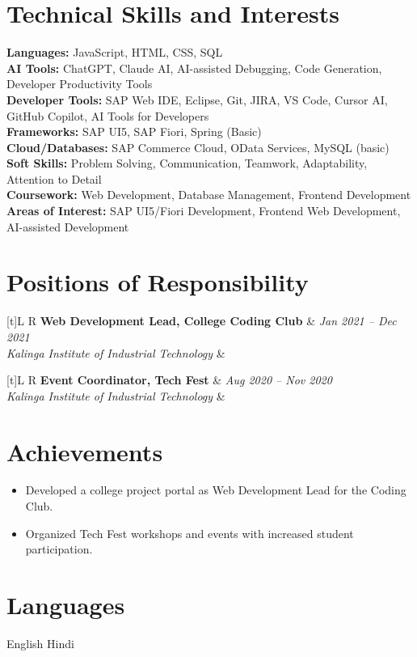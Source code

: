 \documentclass[a4paper,10pt]{article}
\newcommand{\resumeSubheading}[4]{%
  \vspace{1mm}%
  \noindent\begin{tabularx}{\textwidth}[t]{L R}%
    \textbf{#1} & \textit{#2} \\%
    \textit{#3} & \textit{#4} \\%
  \end{tabularx}\vspace{-0.5mm}%
}
\begin{document}
\section{Technical Skills and Interests}
\textbf{Languages:} JavaScript, HTML, CSS, SQL \\
\textbf{AI Tools:} ChatGPT, Claude AI, AI-assisted Debugging, Code Generation, Developer Productivity Tools \\
\textbf{Developer Tools:} SAP Web IDE, Eclipse, Git, JIRA, VS Code, Cursor AI, GitHub Copilot, AI Tools for Developers \\
\textbf{Frameworks:} SAP UI5, SAP Fiori, Spring (Basic) \\
\textbf{Cloud/Databases:} SAP Commerce Cloud, OData Services, MySQL (basic) \\
\textbf{Soft Skills:} Problem Solving, Communication, Teamwork, Adaptability, Attention to Detail \\
\textbf{Coursework:} Web Development, Database Management, Frontend Development \\
\textbf{Areas of Interest:} SAP UI5/Fiori Development, Frontend Web Development, AI-assisted Development

\section{Positions of Responsibility}
\resumeSubheading
  {Web Development Lead, College Coding Club}{Jan 2021 -- Dec 2021}
  {Kalinga Institute of Industrial Technology}{}
\resumeSubheading
  {Event Coordinator, Tech Fest}{Aug 2020 -- Nov 2020}
  {Kalinga Institute of Industrial Technology}{}

\section{Achievements}
\begin{itemize}
  \item Developed a college project portal as Web Development Lead for the Coding Club.
  \item Organized Tech Fest workshops and events with increased student participation.
\end{itemize}

\section{Languages}
English \textbar{} Hindi
\end{document}

